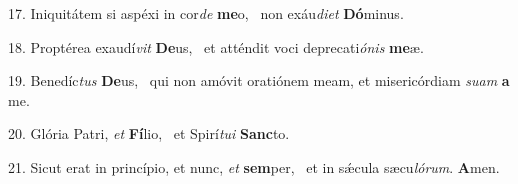 17. Iniquitátem si aspéxi in cor\textit{de} \textbf{me}o, \ast\  non exáu\textit{di}\textit{et} \textbf{Dó}minus.\

18. Proptérea exaudí\textit{vit} \textbf{De}us, \ast\  et atténdit voci deprecati\textit{ó}\textit{nis} \textbf{me}æ.\

19. Benedíc\textit{tus} \textbf{De}us, \ast\  qui non amóvit oratiónem meam, et misericórdiam \textit{su}\textit{am} \textbf{a} me.\

20. Glória Patri, \textit{et} \textbf{Fí}lio, \ast\  et Spirí\textit{tu}\textit{i} \textbf{Sanc}to.\

21. Sicut erat in princípio, et nunc, \textit{et} \textbf{sem}per, \ast\  et in sǽcula sæcu\textit{ló}\textit{rum}. \textbf{A}men.\

